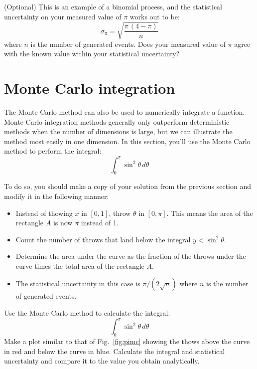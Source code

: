 {\plot (Optional)  This is an example of a binomial process, and the statistical
uncertainty on your measured value of $\pi$ works out to be:
\begin{displaymath}
\sigma_\pi = \sqrt{\frac{\pi \, (4-\pi)}{n}}
\end{displaymath}
where $n$ is the number of generated events.  Does your measured value
of $\pi$ agree with the known value within your statistical
uncertainty?\\

\section{Monte Carlo integration}
\label{sec:mcint}

The Monte Carlo method can also be used to numerically integrate a
function.  Monte Carlo integration methods generally only outperform
deterministic methods when the number of dimensions is large, but we
can illustrate the method most easily in one dimension. In this
section, you'll use the Monte Carlo method to perform the integral:
\begin{displaymath}
  \int_0^\pi \sin^2 \theta \, d\theta
\end{displaymath}

To do so, you should make a copy of your solution from the previous section
and modify it in the following manner:
\begin{itemize}
 \item Instead of thowing $x$ in $[0,1]$, throw $\theta$ in $[0,\pi]$.  This means the area of the rectangle $A$ is now $\pi$ instead of 1.
 \item Count the number of throws that land below the integral $y < \sin^2 \theta$.
 \item Determine the area under the curve as the fraction of the throws under the curve times the total area of the rectangle $A$.
 \item The statistical uncertainty in this case is $\pi/(2\sqrt{n})$ where $n$ is the number of generated events.
\end{itemize}  

\begin{plot} \end{plot}
Use the Monte Carlo method to calculate the integral:
\begin{displaymath}
  \int_0^\pi \sin^2 \theta \, d\theta
\end{displaymath}
Make a plot similar to that of Fig.~\ref{fig:pimc} showing the thows
above the curve in red and below the curve in blue.  Calculate the
integral and statistical uncertainty and compare it to the value you obtain analytically.

}
